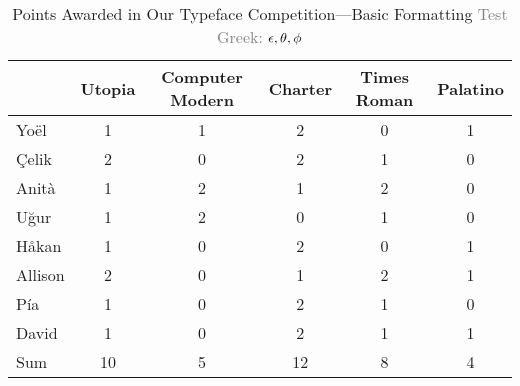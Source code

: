 


\begin{table}[t]
	\caption{Points Awarded in Our Typeface Competition---Basic Formatting \textcolor{gray}{Test Greek: $\protect\epsilon, \protect\theta, \protect\phi$}}
	\label{tab:basic_formatting}
	\begin{tabular}{@{}lccccc@{}}
		\toprule
					&	Utopia	&	Computer Modern	&	Charter	&	Times Roman	&	Palatino	\\
		\midrule
		Yo\"{e}l	&	1	&	1	&	2	&	0	&	1	\\
		\c{C}elik	&	2	&	0	&	2	&	1	&	0	\\
		Anit\`{a}	&	1	&	2	&	1	&	2	&	0	\\
		U\u{g}ur	&	1	&	2	&	0	&	1	&	0	\\
		H\r{a}kan	&	1	&	0	&	2	&	0	&	1	\\
		Allison		&	2	&	0	&	1	&	2	&	1	\\
		P\'{i}a		&	1	&	0	&	2	&	1	&	0	\\
		David		&	1	&	0	&	2	&	1	&	1	\\
		\midrule
		Sum			&  10	&	5	&	12	&	8	&	4	\\
		\bottomrule
	\end{tabular}
\end{table}

